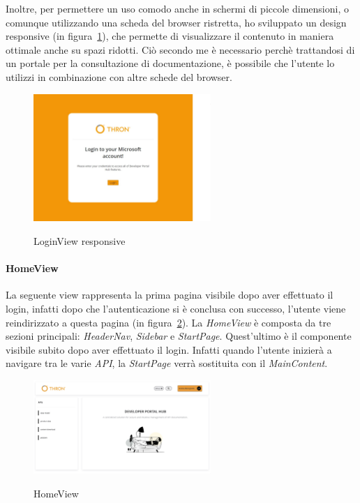 Inoltre, per permettere un uso comodo anche in schermi di piccole dimensioni, o comunque utilizzando una scheda del browser ristretta, ho sviluppato
un design responsive (in figura~\ref{fig:login-view-responsive}), che permette di visualizzare il contenuto in maniera ottimale anche su spazi ridotti.
Ciò secondo me è necessario perchè trattandosi di un portale per la consultazione di documentazione, è possibile che l'utente 
lo utilizzi in combinazione con altre schede del browser.

\begin{figure}[ht]
  \centering
  \includegraphics[width=0.6\textwidth, alt={Pagina di login responsive dell'applicazione}]{images/frontend/LoginViewRes.jpg}
  \caption{LoginView responsive}\label{fig:login-view-responsive}
\end{figure}


\paragraph{HomeView}\label{par:home-view}
La seguente view rappresenta la prima pagina visibile dopo aver effettuato il login, infatti dopo che l'autenticazione si è conclusa con successo, 
l'utente viene reindirizzato a questa pagina (in figura~\ref{fig:home-view}).
La \textit{HomeView} è composta da tre sezioni principali: \textit{HeaderNav}, \textit{Sidebar} e \textit{StartPage}. Quest'ultimo è il componente visibile 
subito dopo aver effettuato il login. Infatti quando l'utente inizierà a navigare tra le varie \textit{API}, la \textit{StartPage} verrà sostituita con il \textit{MainContent}.

\begin{figure}[ht]
  \centering
  \includegraphics[width=0.6\textwidth, alt={Pagina principale dell'applicazione}]{images/frontend/HomeView.jpg}
  \caption{HomeView}\label{fig:home-view}
\end{figure}
\pagebreak

